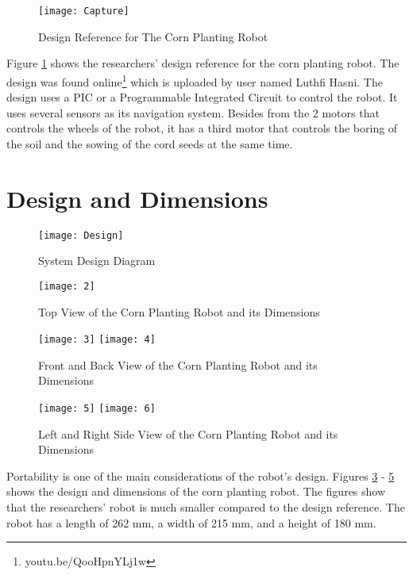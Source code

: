 \begin{figure}[!htbp]
	\centering
		\texttt{[image: Capture]}
	\caption{Design Reference for The Corn Planting Robot}
	\label{fig:reference}
\end{figure}

Figure \ref{fig:reference} shows the researchers' design reference for the corn planting robot. The design was found online\footnote{youtu.be/QooHpnYLj1w} which is uploaded by user named Luthfi Hasni. The design uses a PIC or a Programmable Integrated Circuit to control the robot. It uses several sensors as its navigation system. Besides from the 2 motors that controls the wheels of the robot, it has a third motor that controls the boring of the soil and the sowing of the cord seeds at the same time. 

\section{Design and Dimensions}

\begin{figure}[!htbp]
	\centering
		\texttt{[image: Design]}
	\caption{System Design Diagram}
	\label{fig:Design}
\end{figure}

\begin{figure}[!htbp]
	\centering
		\texttt{[image: 2]}
	\caption{Top View of the Corn Planting Robot and its Dimensions}
	\label{fig:1}
\end{figure}

\begin{figure}[!htbp]
	\centering
		\texttt{[image: 3]}
		\texttt{[image: 4]}
	\caption{Front and Back View of the Corn Planting Robot and its Dimensions}
	\label{fig:2}
\end{figure}

\begin{figure}[!htbp]
	\centering
		\texttt{[image: 5]}
		\texttt{[image: 6]}
	\caption{Left and Right Side View of the Corn Planting Robot and its Dimensions}
	\label{fig:3}
\end{figure}

Portability is one of the main considerations of the robot’s design. Figures \ref{fig:1} - \ref{fig:3} shows the design and dimensions of the corn planting robot. The figures show that the researchers’ robot is much smaller compared to the design reference. The robot has a length of 262 mm, a width of 215 mm, and a height of 180 mm.

